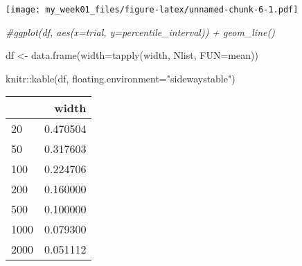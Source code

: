 \documentclass[
]{article}
\newenvironment{Shaded}{\begin{snugshade}}{\end{snugshade}}
\newcommand{\AttributeTok}[1]{\textcolor[rgb]{0.77,0.63,0.00}{#1}}
\newcommand{\CommentTok}[1]{\textcolor[rgb]{0.56,0.35,0.01}{\textit{#1}}}
\newcommand{\FunctionTok}[1]{\textcolor[rgb]{0.00,0.00,0.00}{#1}}
\newcommand{\NormalTok}[1]{#1}
\newcommand{\OtherTok}[1]{\textcolor[rgb]{0.56,0.35,0.01}{#1}}
\newcommand{\SpecialCharTok}[1]{\textcolor[rgb]{0.00,0.00,0.00}{#1}}
\newcommand{\StringTok}[1]{\textcolor[rgb]{0.31,0.60,0.02}{#1}}
\begin{document}
\texttt{[image: my\_week01\_files/figure-latex/unnamed-chunk-6-1.pdf]}

\begin{Shaded}
\begin{Highlighting}[]
\CommentTok{\#ggplot(df, aes(x=trial, y=percentile\_interval)) + geom\_line() }
\end{Highlighting}
\end{Shaded}

\begin{Shaded}
\begin{Highlighting}[]
\NormalTok{df }\OtherTok{\textless{}{-}} \FunctionTok{data.frame}\NormalTok{(}\AttributeTok{width=}\FunctionTok{tapply}\NormalTok{(width, Nlist, }\AttributeTok{FUN=}\NormalTok{mean))}

\NormalTok{knitr}\SpecialCharTok{::}\FunctionTok{kable}\NormalTok{(df, }\AttributeTok{floating.environment=}\StringTok{"sidewaystable"}\NormalTok{)}
\end{Highlighting}
\end{Shaded}

\begin{longtable}[]{@{}lr@{}}
\toprule
& width \\
\midrule
\endhead
20 & 0.470504 \\
50 & 0.317603 \\
100 & 0.224706 \\
200 & 0.160000 \\
500 & 0.100000 \\
1000 & 0.079300 \\
2000 & 0.051112 \\
\bottomrule
\end{longtable}
\end{document}
